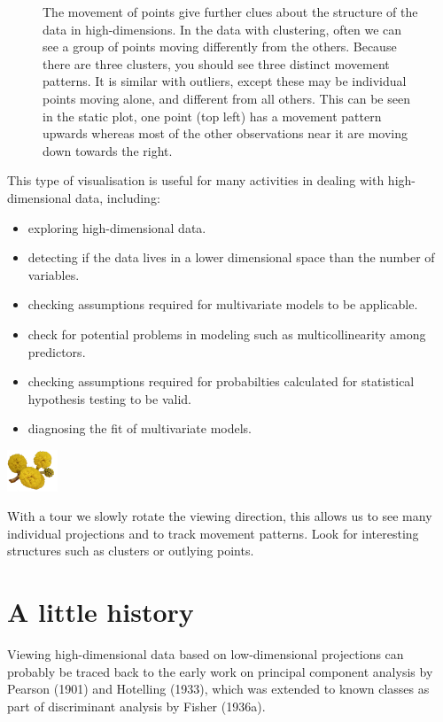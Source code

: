 \documentclass[
  letterpaper,
]{krantz}
\providecommand{\tightlist}{%
  \setlength{\itemsep}{0pt}\setlength{\parskip}{0pt}}\usepackage{longtable,booktabs,array}
\newcommand{\infobox}[1]{%
\noindent\colorbox{info!30}{%
\begin{minipage}{0.98\linewidth}%
    \centering%
    \begin{minipage}[c]{0.15\linewidth} %
      \includegraphics[width=1.5cm]{images/mulga-flowers2.png} %
    \end{minipage}%
    \hfill %
    \begin{minipage}[c]{0.8\linewidth} %
      \bigskip%
      \textsf{#1}%
      \bigskip%
    \end{minipage}%
    \hspace*{3mm}%
  \end{minipage}%
}%
}
\begin{document}
\begin{figure}
\begin{minipage}[t]{0.50\linewidth}
{{}

}

\end{minipage}%

\caption{\label{fig-trails}The movement of points give further clues
about the structure of the data in high-dimensions. In the data with
clustering, often we can see a group of points moving differently from
the others. Because there are three clusters, you should see three
distinct movement patterns. It is similar with outliers, except these
may be individual points moving alone, and different from all others.
This can be seen in the static plot, one point (top left) has a movement
pattern upwards whereas most of the other observations near it are
moving down towards the right.}

\end{figure}

This type of visualisation is useful for many activities in dealing with
high-dimensional data, including:

\begin{itemize}
\tightlist
\item
  exploring high-dimensional data.
\item
  detecting if the data lives in a lower dimensional space than the
  number of variables.
\item
  checking assumptions required for multivariate models to be
  applicable.
\item
  check for potential problems in modeling such as multicollinearity
  among predictors.
\item
  checking assumptions required for probabilties calculated for
  statistical hypothesis testing to be valid.
\item
  diagnosing the fit of multivariate models.
\end{itemize}

\infobox{With a tour we slowly rotate the viewing direction, this allows us to see many individual projections and to track movement patterns. Look for interesting structures such as clusters or outlying points.}

\hypertarget{a-little-history}{%
\section{A little history}\label{a-little-history}}

Viewing high-dimensional data based on low-dimensional projections can
probably be traced back to the early work on principal component
analysis by Pearson (1901) and Hotelling (1933), which was extended to
known classes as part of discriminant analysis by Fisher (1936a).
\end{document}
